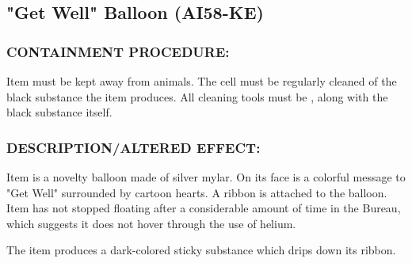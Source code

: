 \subsection*{"Get Well" Balloon (AI58-KE)}
\subsubsection*{CONTAINMENT PROCEDURE:}
\par Item must be kept away from animals.
The cell must be regularly cleaned of the
black substance the item produces. All
cleaning tools must be , along with
the black substance itself.
\subsubsection*{DESCRIPTION/ALTERED EFFECT:}
\par Item is a novelty balloon made of silver mylar. On its face is a
colorful message to "Get Well" surrounded by cartoon hearts. A
ribbon is attached to the balloon. Item has not stopped floating
after a considerable amount of time in the Bureau, which
suggests it does not hover through the use of helium.
\par The item produces a dark-colored sticky substance which drips
down its ribbon.